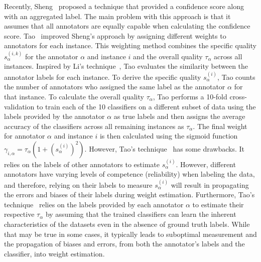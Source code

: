 Recently, Sheng~\cite{sheng_Majority_2019} proposed a technique that provided a confidence score along with an aggregated label. The main problem with this approach is that it assumes that all annotators are equally capable when calculating the confidence score. Tao~\cite{tao_Label_2020} improved Sheng's approach by assigning different weights to annotators for each instance. This weighting method combines the specific quality $s_\alpha^{(i,k)} $ for the annotator $\alpha $ and instance $i $ and the overall quality $\tau_\alpha$ across all instances. Inspired by Li's technique~\cite{li_Incorporating_2018}, Tao evaluates the similarity between the annotator labels for each instance. To derive the specific quality $s_{\alpha}^{(i)}$, Tao counts the number of annotators who assigned the same label as the annotator $\alpha $ for that instance. To calculate the overall quality $\tau_\alpha $, Tao performs a 10-fold cross-validation to train each of the 10 classifiers on a different subset of data using the labels provided by the annotator $\alpha $ as true labels and then assigns the average accuracy of the classifiers across all remaining instances as $\tau_\alpha $. The final weight for annotator $\alpha $ and instance $i $ is then calculated using the sigmoid function $\gamma_{i,\alpha}=\tau_\alpha\left(1+{\left(s_{\alpha}^{(i)}\right)}^{2}\right) $. However, Tao's technique~\cite{tao_Label_2020} has some drawbacks. It relies on the labels of other annotators to estimate $s_{\alpha}^{(i)} $. However, different annotators have varying levels of competence (reliability) when labeling the data, and therefore, relying on their labels to measure $s_{\alpha}^{(i)} $ will result in propagating the errors and biases of their labels during weight estimation. Furthermore, Tao's technique~\cite{tao_Label_2020} relies on the labels provided by each annotator $\alpha $ to estimate their respective $\tau_\alpha $ by assuming that the trained classifiers can learn the inherent characteristics of the datasets even in the absence of ground truth labels. While that may be true in some cases, it typically leads to suboptimal measurement and the propagation of biases and errors, from both the annotator's labels and the classifier, into weight estimation.

